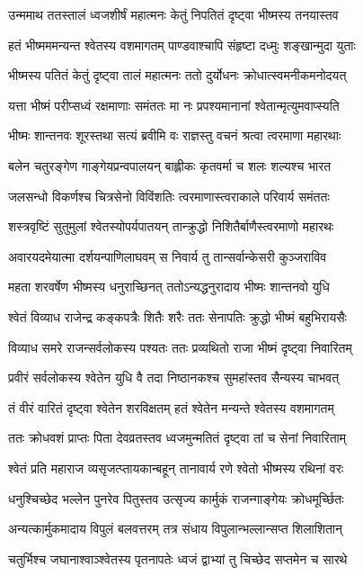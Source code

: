 \twolineshloka
{उन्ममाथ ततस्तालं ध्वजशीर्षं महात्मनः}
{केतुं निपतितं दृष्ट्वा भीष्मस्य तनयास्तव}


\twolineshloka
{हतं भीष्मममन्यन्त श्वेतस्य वशमागतम्}
{पाण्डवाश्चापि संहृष्टा दध्मुः शङ्खान्मुदा युताः}


\twolineshloka
{भीष्मस्य पतितं केतुं दृष्ट्वा तालं महात्मनः}
{ततो दुर्योधनः क्रोधात्स्वमनीकमनोदयत्}


\twolineshloka
{यत्ता भीष्मं परीप्सध्वं रक्षमाणाः समंततः}
{मा नः प्रपश्यमानानां श्वेतान्मृत्युमवाप्स्यति}


\twolineshloka
{भीष्मः शान्तनवः शूरस्तथा सत्यं ब्रवीमि वः}
{राज्ञस्तु वचनं श्रत्वा त्वरमाणा महारथाः}


\twolineshloka
{बलेन चतुरङ्गेण गाङ्गेयप्रन्वपालयन्}
{बाह्लीकः कृतवर्मा च शलः शल्यश्च भारत}


\twolineshloka
{जलसन्धो विकर्णश्च चित्रसेनो विविंशतिः}
{त्वरमाणास्त्वराकाले परिवार्य समंततः}


\twolineshloka
{शस्त्रवृष्टिं सुतुमुलां श्वेतस्योपर्यपातयन्}
{तान्क्रुद्धो निशितैर्बाणैस्त्वरमाणो महारथः}


\twolineshloka
{अवारयदमेयात्मा दर्शयन्पाणिलाघवम्}
{स निवार्य तु तान्सर्वान्केसरी कुञ्जराविव}


\twolineshloka
{महता शरवर्षेण भीष्मस्य धनुराच्छिनत्}
{ततोऽन्यद्धनुरादाय भीष्मः शान्तनवो युधि}


\twolineshloka
{श्वेतं विव्याध राजेन्द्र कङ्कपत्रैः शितैः शरैः}
{ततः सेनापतिः क्रुद्धो भीष्मं बहुभिरायसैः}


\twolineshloka
{विव्याध समरे राजन्सर्वलोकस्य पश्यतः}
{ततः प्रव्यथितो राजा भीष्मं दृष्ट्वा निवारितम्}


\twolineshloka
{प्रवीरं सर्वलोकस्य श्वेतेन युधि वै तदा}
{निष्ठानकश्च सुमहांस्तव सैन्यस्य चाभवत्}


\twolineshloka
{तं वीरं वारितं दृष्ट्वा श्वेतेन शरविक्षतम्}
{हतं श्वेतेन मन्यन्ते श्वेतस्य वशमागतम्}


\twolineshloka
{ततः क्रोधवशं प्राप्तः पिता देवव्रतस्तव}
{ध्वजमुन्मतितं दृष्ट्वा तां च सेनां निवारिताम्}


\twolineshloka
{श्वेतं प्रति महाराज व्यसृजत्प्तायकान्बहून्}
{तानावार्य रणे श्वेतो भीष्मस्य रथिनां वरः}


\twolineshloka
{धनुश्चिच्छेद भल्लेन पुनरेव पितुस्तव}
{उत्सृज्य कार्मुकं राजन्गाङ्गेयः क्रोधमूर्च्छितः}


\twolineshloka
{अन्यत्कार्मुकमादाय विपुलं बलवत्तरम्}
{तत्र संधाय विपुलान्भल्लान्सप्त शिलाशितान्}


\twolineshloka
{चतुर्भिश्च जघानाश्वाञ्श्वेतस्य पृतनापतेः}
{ध्वजं द्वाभ्यां तु चिच्छेद सप्तमेन च सारथे}



